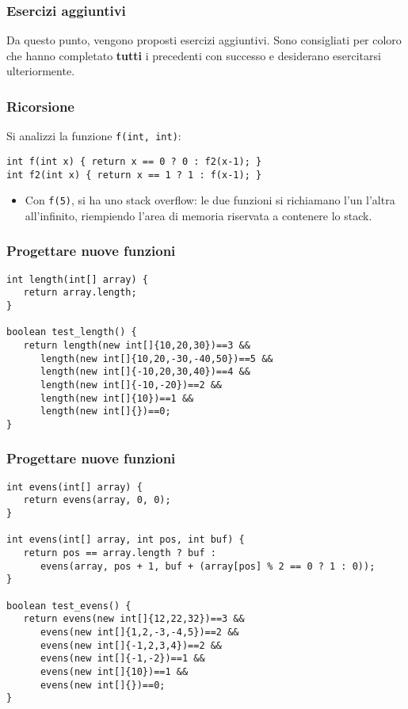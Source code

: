 \documentclass{beamer}
\begin{document}
\begin{frame}[fragile]
\frametitle{Esercizi aggiuntivi}
Da questo punto, vengono proposti esercizi aggiuntivi. Sono consigliati per coloro che hanno completato \textbf{tutti} i precedenti con successo e desiderano esercitarsi ulteriormente.
\end{frame}

\begin{frame}[fragile]
\frametitle{Ricorsione}
Si analizzi la funzione \texttt{f(int, int)}:
\begin{verbatim}
int f(int x) { return x == 0 ? 0 : f2(x-1); }
int f2(int x) { return x == 1 ? 1 : f(x-1); }
\end{verbatim}
\begin{itemize}
 \item Con \texttt{f(5)}, si ha uno stack overflow: le due funzioni si richiamano l'un l'altra all'infinito, riempiendo l'area di memoria riservata a contenere lo stack.
\end{itemize}
\end{frame}

\begin{frame}[fragile]
\frametitle{Progettare nuove funzioni}
\begin{verbatim}
int length(int[] array) {
   return array.length;
}

boolean test_length() {
   return length(new int[]{10,20,30})==3 &&
      length(new int[]{10,20,-30,-40,50})==5 &&
      length(new int[]{-10,20,30,40})==4 &&
      length(new int[]{-10,-20})==2 &&
      length(new int[]{10})==1 &&
      length(new int[]{})==0;
}
\end{verbatim}
\end{frame}

\begin{frame}[fragile]
\frametitle{Progettare nuove funzioni}
\begin{verbatim}
int evens(int[] array) {
   return evens(array, 0, 0);
}

int evens(int[] array, int pos, int buf) { 
   return pos == array.length ? buf :
      evens(array, pos + 1, buf + (array[pos] % 2 == 0 ? 1 : 0));
}

boolean test_evens() {
   return evens(new int[]{12,22,32})==3 &&
      evens(new int[]{1,2,-3,-4,5})==2 &&
      evens(new int[]{-1,2,3,4})==2 &&
      evens(new int[]{-1,-2})==1 &&
      evens(new int[]{10})==1 &&
      evens(new int[]{})==0;
}
\end{verbatim}
\end{frame}
\end{document}
